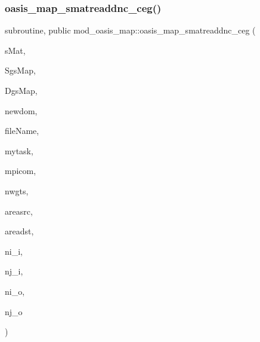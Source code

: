\subsubsection{\texorpdfstring{oasis\+\_\+map\+\_\+smatreaddnc\+\_\+ceg()}{oasis\_map\_smatreaddnc\_ceg()}}
{\footnotesize\ttfamily subroutine, public mod\+\_\+oasis\+\_\+map\+::oasis\+\_\+map\+\_\+smatreaddnc\+\_\+ceg (\begin{DoxyParamCaption}\item[{type(mct\+\_\+smat), dimension(\+:), intent(out), pointer}]{s\+Mat,  }\item[{type(mct\+\_\+gsmap), intent(\hyperlink{namespacemod__oasis__map_aa58997467050224f6db2bc93fe5f7ca1}{in}), target}]{Sgs\+Map,  }\item[{type(mct\+\_\+gsmap), intent(\hyperlink{namespacemod__oasis__map_aa58997467050224f6db2bc93fe5f7ca1}{in}), target}]{Dgs\+Map,  }\item[{character($\ast$), intent(\hyperlink{namespacemod__oasis__map_aa58997467050224f6db2bc93fe5f7ca1}{in})}]{newdom,  }\item[{character($\ast$), intent(\hyperlink{namespacemod__oasis__map_aa58997467050224f6db2bc93fe5f7ca1}{in})}]{file\+Name,  }\item[{integer(\hyperlink{namespacemod__oasis__map_aa58997467050224f6db2bc93fe5f7ca1}{in}), intent(\hyperlink{namespacemod__oasis__map_aa58997467050224f6db2bc93fe5f7ca1}{in})}]{mytask,  }\item[{integer(\hyperlink{namespacemod__oasis__map_aa58997467050224f6db2bc93fe5f7ca1}{in}), intent(\hyperlink{namespacemod__oasis__map_aa58997467050224f6db2bc93fe5f7ca1}{in})}]{mpicom,  }\item[{integer(\hyperlink{namespacemod__oasis__map_aa58997467050224f6db2bc93fe5f7ca1}{in}), intent(out)}]{nwgts,  }\item[{type(mct\+\_\+avect), intent(out), optional}]{areasrc,  }\item[{type(mct\+\_\+avect), intent(out), optional}]{areadst,  }\item[{integer(\hyperlink{namespacemod__oasis__map_aa58997467050224f6db2bc93fe5f7ca1}{in}), intent(out), optional}]{ni\+\_\+i,  }\item[{integer(\hyperlink{namespacemod__oasis__map_aa58997467050224f6db2bc93fe5f7ca1}{in}), intent(out), optional}]{nj\+\_\+i,  }\item[{integer(\hyperlink{namespacemod__oasis__map_aa58997467050224f6db2bc93fe5f7ca1}{in}), intent(out), optional}]{ni\+\_\+o,  }\item[{integer(\hyperlink{namespacemod__oasis__map_aa58997467050224f6db2bc93fe5f7ca1}{in}), intent(out), optional}]{nj\+\_\+o }\end{DoxyParamCaption})}



